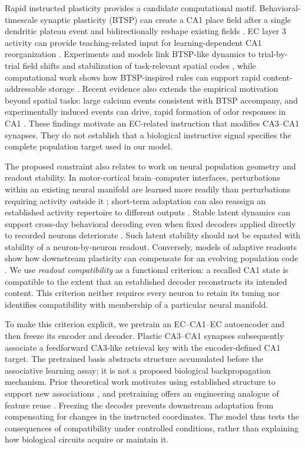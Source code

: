 Rapid instructed plasticity provides a candidate computational motif.
Behavioral-timescale synaptic plasticity (BTSP) can create a CA1 place field
after a single dendritic plateau event and bidirectionally reshape existing
fields \citep{bittner2017,milstein2021}. EC layer 3 activity can provide
teaching-related input for learning-dependent CA1 reorganization
\citep{grienberger2022}. Experiments and models link BTSP-like dynamics to
trial-by-trial field shifts and stabilization of task-relevant spatial codes
\citep{madar2025,vaidya2025}, while computational work shows how BTSP-inspired
rules can support rapid content-addressable storage \citep{wu2025}.
Recent evidence also extends the empirical motivation beyond spatial tasks:
large calcium events consistent with BTSP accompany, and experimentally
induced events can drive, rapid formation of odor responses in CA1
\citep{dorian2026a}. These findings motivate an EC-related instruction that
modifies CA3--CA1 synapses. They do not establish that a biological instructive
signal specifies the complete population target used in our model.

The proposed constraint also relates to work on neural population geometry
and readout stability. In motor-cortical brain--computer interfaces,
perturbations within an existing neural manifold are learned more readily
than perturbations requiring activity outside it \citep{sadtler2014};
short-term adaptation can also reassign an established activity repertoire
to different outputs \citep{golub2018}. Stable latent dynamics can support
cross-day behavioral decoding even when fixed decoders applied directly to
recorded neurons deteriorate \citep{gallego2020}. Such latent stability should
not be equated with stability of a neuron-by-neuron readout. Conversely,
models of adaptive readouts show how downstream plasticity can compensate
for an evolving population code \citep{rule2022}. We use \emph{readout
compatibility} as a functional criterion: a recalled CA1 state is compatible
to the extent that an established decoder reconstructs its intended content.
This criterion neither requires every neuron to retain its tuning nor
identifies compatibility with membership of a particular neural manifold.

To make this criterion explicit, we pretrain an EC--CA1--EC autoencoder and
then freeze its encoder and decoder. Plastic CA3--CA1 synapses subsequently
associate a feedforward CA3-like retrieval key with the encoder-defined CA1
target. The pretrained basis abstracts structure accumulated before the
associative learning assay; it is not a proposed biological backpropagation
mechanism. Prior theoretical work motivates using established structure to
support new associations \citep{schapiro2017,chandra2025}, and pretraining
offers an engineering analogue of feature reuse \citep{yosinski2014}.
Freezing the decoder prevents downstream adaptation from compensating for
changes in the instructed coordinates. The model thus tests the consequences
of compatibility under controlled conditions, rather than explaining how
biological circuits acquire or maintain it.

